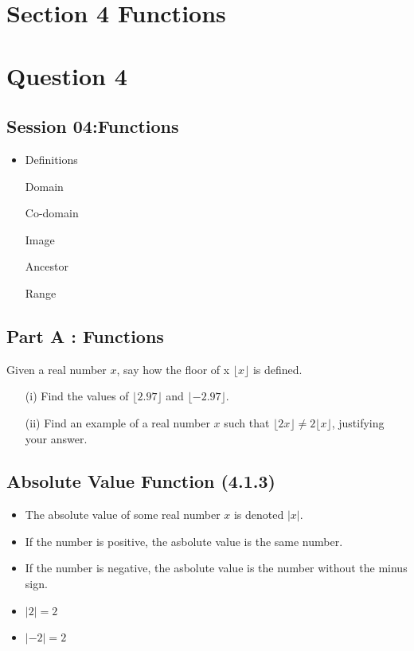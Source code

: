 \documentclass[]{report}
\begin{document}
\section{Section 4 Functions}



\section*{Question 4}



\subsection*{Session 04:Functions}
\begin{itemize}
\item Definitions
\end{itemize}

\begin{itemize}
\item[Domain]
\item[Co-domain]
\item[Image]
\item[Ancestor]
\item[Range]
\end{itemize}

\subsection*{Part A : Functions}
Given a real number $x$, say how the floor of x  $\lfloor x \rfloor$ is defined.
\begin{itemize}
\item[(i)] Find the values of $\lfloor 2.97 \rfloor$ and $\lfloor -2.97 \rfloor$.
\item[(ii)] Find an example of a real number $x$ such that $\lfloor 2x \rfloor  \neq 2\lfloor x \rfloor$, justifying your answer.
\end{itemize}



\subsection*{Absolute Value Function (4.1.3)}


\begin{itemize}
\item The absolute value of some real number $x$ is denoted $|x|$.
\item If the number is positive, the asbolute value is the same number.
\item If the number is negative, the asbolute value is the number without the minus sign.
\item $|2|=2$
\item $|-2| = 2$
\end{itemize}
\end{document}
